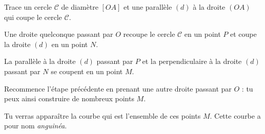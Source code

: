 \begin{myenumerate}
  \item Trace un cercle $\mathscr C$ de diamètre $[OA]$ et une
    parallèle $(d)$ à la droite $(OA)$ qui coupe le cercle $\mathscr C$.
  \item Une droite quelconque passant par $O$ recoupe le cercle
    $\mathscr C$ en un point $P$ et coupe la droite $(d)$ en un point $N$.
  \item La parallèle à la droite $(d)$ passant par $P$ et la
    perpendiculaire à la droite $(d)$ passant par $N$ se coupent en un
    point $M$.
  \item Recommence l'étape précédente en prenant une autre droite
    passant par $O$ : tu peux ainsi construire de nombreux points $M$.
\end{myenumerate}
Tu verras apparaître la courbe qui est l'ensemble de ces points
$M$. Cette courbe a pour nom {\em anguinéa}.
